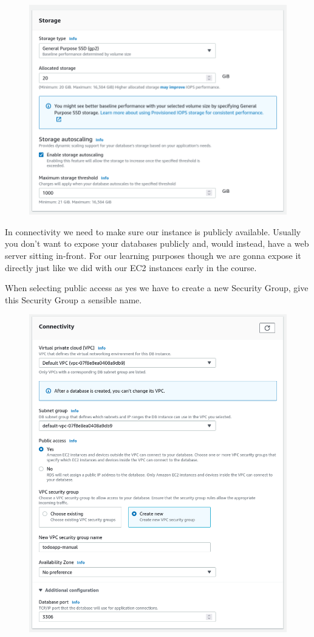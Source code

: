 \documentclass{csse4400}
\begin{document}
\begin{figure}[H]
  \includegraphics[width=\textwidth]{images/db5}
\end{figure}

In connectivity we need to make sure our instance is publicly available. Usually you don't want to expose your databases publicly and, would instead, have a web server sitting in-front. For our learning purposes though we are gonna expose it directly just like we did with our EC2 instances early in the course.

When selecting public access as yes we have to create a new Security Group,
give this Security Group a sensible name.

\begin{figure}[H]
  \includegraphics[width=\textwidth]{images/db6}
\end{figure}
\end{document}
